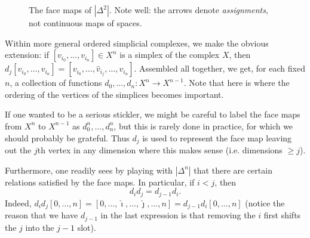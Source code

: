 \documentclass[12pt]{article}
\theoremstyle{plain}
\theoremstyle{definition}
\begin{document}
\begin{figure}[!htp]
\begin{center}
\end{center}
\caption{The face maps of $|\Delta^2|$. Note well: the arrows denote \emph{assignments}, not continuous maps of spaces. }\label{F: fig3}
\end{figure}


Within more general ordered simplicial complexes, we make the obvious extension: if $[v_{i_0},\ldots, v_{i_n}]\in X^n$ is a simplex of the complex $X$, then $d_j[v_{i_0},\ldots, v_{i_n}]=[v_{i_0},\ldots,\hat v_{i_j},\dots, v_{i_n}]$. Assembled all together, we get, for each fixed $n$, a collection of functions $d_0,\ldots, d_n\colon X^n\to X^{n-1}$. Note that here is where the ordering of the vertices of the simplices becomes important.

If one wanted to be a serious stickler, we might be careful to label the face maps from $X^n$ to $X^{n-1}$ as $d_0^n, \ldots, d_n^n$, but this is rarely done in practice, for which we should probably be grateful. Thus $d_j$ is used to represent the face map leaving out the $j$th vertex in any dimension where this makes sense (i.e. dimensions $\geq j$).

Furthermore, one readily sees by playing with $|\Delta^n|$ that there are certain relations satisfied by the face maps. In particular, if $i<j$, then 
\begin{equation}\label{E: d com}
d_id_j=d_{j-1}d_i.
\end{equation}
 Indeed, $d_id_j[0,\ldots, n]=[0,\ldots, \hat \imath,\ldots, \hat \jmath,\ldots, n]=d_{j-1}d_i[0,\ldots,n]$ (notice the reason that we have $d_{j-1}$ in the last expression is that removing the $i$ first shifts the $j$ into the $j-1$ slot). 
\end{document}
